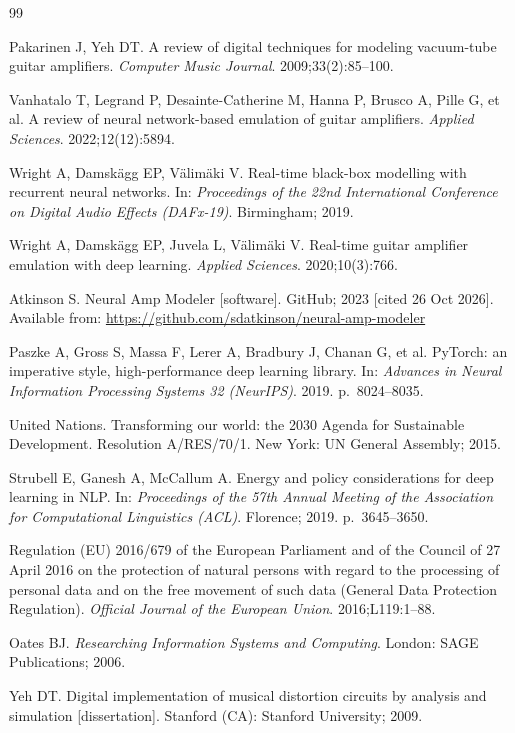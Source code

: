 \documentclass[ENG]{TFUOC}%
\begin{document}
\begin{thebibliography}{99}

 Pakarinen J, Yeh DT. A review of digital techniques for modeling vacuum-tube guitar amplifiers. \emph{Computer Music Journal}. 2009;33(2):85--100.

 Vanhatalo T, Legrand P, Desainte-Catherine M, Hanna P, Brusco A, Pille G, et al. A review of neural network-based emulation of guitar amplifiers. \emph{Applied Sciences}. 2022;12(12):5894.

 Wright A, Damskägg EP, Välimäki V. Real-time black-box modelling with recurrent neural networks. In: \emph{Proceedings of the 22nd International Conference on Digital Audio Effects (DAFx-19)}. Birmingham; 2019.

 Wright A, Damskägg EP, Juvela L, Välimäki V. Real-time guitar amplifier emulation with deep learning. \emph{Applied Sciences}. 2020;10(3):766.

 Atkinson S. Neural Amp Modeler [software]. GitHub; 2023 [cited 26 Oct 2026]. Available from: \url{https://github.com/sdatkinson/neural-amp-modeler}

 Paszke A, Gross S, Massa F, Lerer A, Bradbury J, Chanan G, et al. PyTorch: an imperative style, high-performance deep learning library. In: \emph{Advances in Neural Information Processing Systems 32 (NeurIPS)}. 2019. p.~8024--8035.

 United Nations. Transforming our world: the 2030 Agenda for Sustainable Development. Resolution A/RES/70/1. New York: UN General Assembly; 2015.

 Strubell E, Ganesh A, McCallum A. Energy and policy considerations for deep learning in NLP. In: \emph{Proceedings of the 57th Annual Meeting of the Association for Computational Linguistics (ACL)}. Florence; 2019. p.~3645--3650.

 Regulation (EU) 2016/679 of the European Parliament and of the Council of 27 April 2016 on the protection of natural persons with regard to the processing of personal data and on the free movement of such data (General Data Protection Regulation). \emph{Official Journal of the European Union}. 2016;L119:1--88.

 Oates BJ. \emph{Researching Information Systems and Computing}. London: SAGE Publications; 2006.

 Yeh DT. Digital implementation of musical distortion circuits by analysis and simulation [dissertation]. Stanford (CA): Stanford University; 2009.


\end{thebibliography}
\end{document}
